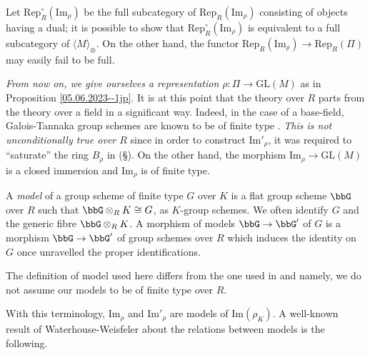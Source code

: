 \documentclass[10pt]{alggeom}
\theoremstyle{definition}
\numberwithin{equation}{section}
\begin{document}
\rema Let $\mathrm{Rep}_R^\circ(\mathrm{Im}_\rho)$ be the full subcategory of $\mathrm{Rep}_R(\mathrm{Im}_\rho)$ consisting of objects having a dual; it is possible to show that $\mathrm{Rep}_R^\circ(\mathrm{Im}_\rho)$ is equivalent to a full subcategory of $\langle M\rangle_\otimes$. On   the other hand, the functor  $\mathrm{Rep}_R(\mathrm{Im}_\rho)\to \mathrm{Rep}_R(\Pi)$ may easily fail to be full.  
\xrema






{\it From now on, we give ourselves a representation $\rho:\Pi\to \mathrm{GL}(M)$} as in Proposition \ref{05.06.2023--1jp}. 
It is at this point that  the theory over $R$ parts from the theory over a field in a   significant way. Indeed, in the case of a base-field,  Galois-Tannaka group schemes  are known to be of finite type \cite[Proposition 2.20]{deligne-milne82}. {\it This is not unconditionally true over $R$} since in order to construct $\mathrm{Im}'_\rho$, it was required to ``saturate'' the ring $B_\rho$ in (\S). On the other hand,  the morphism  $\mathrm{Im}_\rho\to \mathrm{GL}(M)$ is a closed immersion and $\mathrm{Im}_\rho$ is of finite type. 


 A {\it model} of a   group scheme of finite type $G$ over $K$ is a flat group scheme $\bbG$ over $R$ such that $\bbG \otimes_R K \cong  G$,  as $K$-group schemes. We often   identify
 $G$ and the generic fibre $\bbG\otimes_RK$. 
A morphism of models $\bbG \to \bbG'$ of 
$G$ is a morphism $ \bbG \to \bbG'$ of group schemes over 
$R $ which induces the identity on $G$ once unravelled the proper identifications. 
\xdefi

\rema The definition of   model used here    differs from the one used in \cite[\href{https://stacks.math.columbia.edu/tag/0C2R}{Tag 0C2R}]{stacks-project} and \cite{WW80}  namely, we do not assume our models to be of finite type over $R$. 
\xrema

With this terminology, $\mathrm{Im}_\rho$  and $\mathrm{Im}'_\rho$ are models of        $\mathrm{Im}(\rho_K)$. 
 A well-known result of Waterhouse-Weisfeler about the relations between models is the following. 
\end{document}
